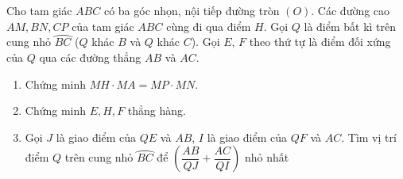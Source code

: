 \begin{ex}%
	Cho tam giác $ABC$ có ba góc nhọn, nội tiếp đường tròn $(O)$. Các đường cao $AM,BN,CP$ của tam giác $ABC$ cùng đi qua điểm $H$. Gọi $Q$ là điểm bất kì trên cung nhỏ $\wideparen{BC}$ ($Q$ khác $B$ và $Q$ khác $C$). Gọi $E$, $F$ theo thứ tự là điểm đối xứng của $Q$ qua các đường thẳng $AB$ và $AC$.
	\begin{enumerate}
		\item Chứng minh $MH \cdot MA=MP \cdot MN$.
		\item Chứng minh $E,H,F$ thẳng hàng.
		\item Gọi $J$ là giao điểm của $QE$ và $AB$, $I$ là giao điểm của $QF$ và $AC$. Tìm vị trí điểm $Q$ trên cung nhỏ $\wideparen{BC}$ để $\left(\dfrac{AB}{QJ}+\dfrac{AC}{QI}\right)$ nhỏ nhất
	\end{enumerate}
\end{ex}
